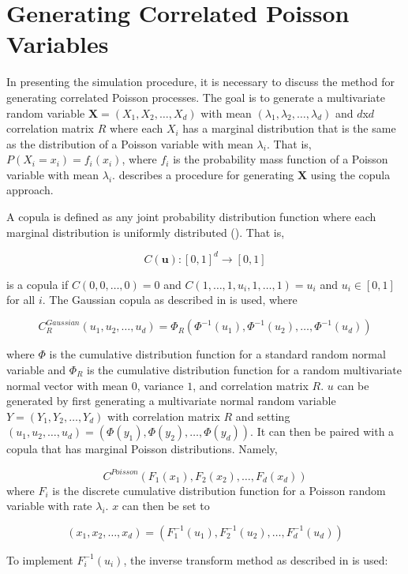 \section{Generating Correlated Poisson Variables}\label{ch:generate_correlated_poisson}
In presenting the simulation procedure, it is necessary to discuss the method for generating correlated Poisson processes. The goal is to generate a multivariate random variable $\boldsymbol{X} = (X_1, X_2, \ldots, X_d)$ with mean $(\lambda_1, \lambda_2, \ldots, \lambda_{d})$ and $d$x$d$ correlation matrix $R$ where each $X_i$ has a marginal distribution that is the same as the distribution of a Poisson variable with mean $\lambda_i$. That is, $P(X_i = x_i) = f_i(x_i)$, where $f_i$ is the probability mass function of a Poisson variable with mean $\lambda_i$. \cite{A8} describes a procedure for generating $\boldsymbol{X}$ using the copula approach. 

A copula is defined as any joint probability distribution function where each marginal distribution is uniformly distributed (\cite{B1}). That is, 

$$C(\boldsymbol{u}): [0,1]^d \to [0,1]$$ 

is a copula if $C(0, 0, \ldots, 0) = 0$ and $C(1, \ldots, 1, u_i, 1, \ldots, 1) = u_i$ and $u_i \in [0,1]$ for all $i$. The Gaussian copula as described in \cite{A8} is used, where

$$ C_R^{Gaussian}(u_1, u_2, \ldots, u_d) = \Phi_{R}(\Phi^{-1}(u_1), \Phi^{-1}(u_2), \ldots,  \Phi^{-1}(u_d))$$

where $\Phi$ is the cumulative distribution function for a standard random normal variable and $\Phi_{R}$ is the cumulative distribution function for a random multivariate normal vector with mean $0$, variance $1$, and correlation matrix $R$. $u$ can be generated by first generating a multivariate normal random variable $Y = (Y_1,Y_2, \ldots, Y_d)$ with correlation matrix $R$ and setting $(u_1, u_2, \ldots, u_d) = (\Phi(y_1), \Phi(y_2), \ldots,  \Phi(y_d))$. It can then be paired with a copula that has marginal Poisson distributions. Namely,

$$ C^{Poisson}(F_1(x_1), F_2(x_2), \ldots, F_d(x_d))$$ where $F_i$ is the discrete cumulative distribution function for a Poisson random variable with rate $\lambda_i$. $x$ can then be set to

$$(x_1, x_2, \ldots, x_d) = (F^{-1}_1(u_1), F^{-1}_2(u_2), \ldots, F^{-1}_d(u_d))$$

To implement $F^{-1}_i(u_i)$, the inverse transform method as described in \cite{B1} is used:
\newline


